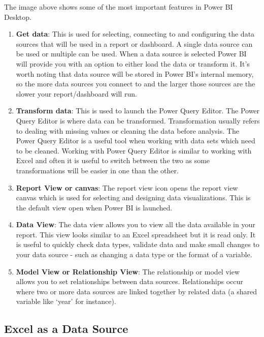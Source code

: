 \documentclass[
]{book}
\begin{document}
The image above shows some of the most important features in Power BI Desktop.

\begin{enumerate}
\def\labelenumi{\arabic{enumi}.}
\item
  \textbf{Get data}: This is used for selecting, connecting to and configuring the data sources that will be used in a report or dashboard. A single data source can be used or multiple can be used. When a data source is selected Power BI will provide you with an option to either load the data or transform it. It's worth noting that data source will be stored in Power BI's internal memory, so the more data sources you connect to and the larger those sources are the slower your report/dashboard will run.
\item
  \textbf{Transform data}: This is used to launch the Power Query Editor. The Power Query Editor is where data can be transformed. Transformation usually refers to dealing with missing values or cleaning the data before analysis. The Power Query Editor is a useful tool when working with data sets which need to be cleaned. Working with Power Query Editor is similar to working with Excel and often it is useful to switch between the two as some transformations will be easier in one than the other.
\item
  \textbf{Report View or canvas}: The report view icon opens the report view canvas which is used for selecting and designing data visualizations. This is the default view open when Power BI is launched.
\item
  \textbf{Data View}: The data view allows you to view all the data available in your report. This view looks similar to an Excel spreadsheet but it is read only. It is useful to quickly check data types, validate data and make small changes to your data source - such as changing a data type or the format of a variable.
\item
  \textbf{Model View or Relationship View}: The relationship or model view allows you to set relationships between data sources. Relationships occur where two or more data sources are linked together by related data (a shared variable like `year' for instance).
\end{enumerate}

\hypertarget{excel-as-a-data-source}{%
\subsection{Excel as a Data Source}\label{excel-as-a-data-source}}
\end{document}

